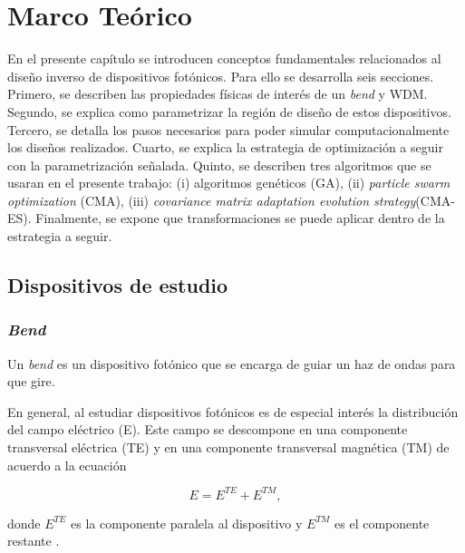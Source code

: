 \chapter{Marco  Teórico}

En el presente capítulo se introducen conceptos fundamentales relacionados al diseño inverso de dispositivos fotónicos.
Para ello se desarrolla seis secciones. 
Primero, se describen las propiedades físicas de interés de un \emph{bend} y WDM.
Segundo, se explica como parametrizar la región de diseño de estos
dispositivos.
Tercero, se detalla los pasos necesarios para poder simular computacionalmente
los diseños realizados.
Cuarto, se explica la estrategia de optimización a seguir con la
parametrización señalada.
Quinto, se describen tres algoritmos que se usaran en el presente trabajo: (i)
algoritmos genéticos (GA), (ii) \emph{particle swarm optimization} (CMA), (iii)
\emph{covariance matrix adaptation evolution strategy}(CMA-ES).
Finalmente, se expone que transformaciones se puede aplicar dentro de la
estrategia a seguir.


\section{Dispositivos de estudio}

\subsection{\emph{Bend}}

Un \emph{bend} es un dispositivo fotónico que se encarga de guiar un haz de ondas para que gire.

En general, al estudiar dispositivos fotónicos es de especial interés la
distribución del campo eléctrico (E). 
Este campo se descompone en una componente transversal eléctrica (TE) y en una componente transversal magnética (TM) de acuerdo a la ecuación

\begin{equation}
  E = E^{TE} + E^{TM},
\label{eq:field}
\end{equation}

donde $E^{TE}$ es la componente paralela al dispositivo y $E^{TM}$ es el componente restante \citep{Hohenester2020}. 

